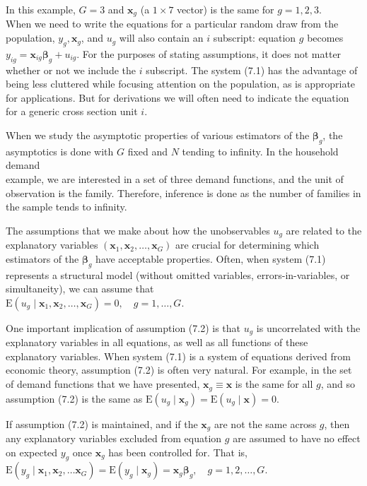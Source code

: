 \documentclass[10pt]{article}
\begin{document}
In this example, $G=3$ and $\mathbf{x}_{g}$ (a $1 \times 7$ vector) is the same for $g=1,2,3$.\\
When we need to write the equations for a particular random draw from the population, $y_{g}, \mathbf{x}_{g}$, and $u_{g}$ will also contain an $i$ subscript: equation $g$ becomes $y_{i g}= \mathbf{x}_{i g} \boldsymbol{\beta}_{g}+u_{i g}$. For the purposes of stating assumptions, it does not matter whether or not we include the $i$ subscript. The system (7.1) has the advantage of being less cluttered while focusing attention on the population, as is appropriate for applications. But for derivations we will often need to indicate the equation for a generic cross section unit $i$.

When we study the asymptotic properties of various estimators of the $\boldsymbol{\beta}_{g}$, the asymptotics is done with $G$ fixed and $N$ tending to infinity. In the household demand\\
example, we are interested in a set of three demand functions, and the unit of observation is the family. Therefore, inference is done as the number of families in the sample tends to infinity.

The assumptions that we make about how the unobservables $u_{g}$ are related to the explanatory variables $\left(\mathbf{x}_{1}, \mathbf{x}_{2}, \ldots, \mathbf{x}_{G}\right)$ are crucial for determining which estimators of the $\boldsymbol{\beta}_{g}$ have acceptable properties. Often, when system (7.1) represents a structural model (without omitted variables, errors-in-variables, or simultaneity), we can assume that\\
$\mathrm{E}\left(u_{g} \mid \mathbf{x}_{1}, \mathbf{x}_{2}, \ldots, \mathbf{x}_{G}\right)=0, \quad g=1, \ldots, G$.

One important implication of assumption (7.2) is that $u_{g}$ is uncorrelated with the explanatory variables in all equations, as well as all functions of these explanatory variables. When system (7.1) is a system of equations derived from economic theory, assumption (7.2) is often very natural. For example, in the set of demand functions that we have presented, $\mathbf{x}_{g} \equiv \mathbf{x}$ is the same for all $g$, and so assumption (7.2) is the same as $\mathrm{E}\left(u_{g} \mid \mathbf{x}_{g}\right)=\mathrm{E}\left(u_{g} \mid \mathbf{x}\right)=0$.

If assumption (7.2) is maintained, and if the $\mathbf{x}_{g}$ are not the same across $g$, then any explanatory variables excluded from equation $g$ are assumed to have no effect on expected $y_{g}$ once $\mathbf{x}_{g}$ has been controlled for. That is,\\
$\mathrm{E}\left(y_{g} \mid \mathbf{x}_{1}, \mathbf{x}_{2}, \ldots \mathbf{x}_{G}\right)=\mathrm{E}\left(y_{g} \mid \mathbf{x}_{g}\right)=\mathbf{x}_{g} \boldsymbol{\beta}_{g}, \quad g=1,2, \ldots, G$.
\end{document}

